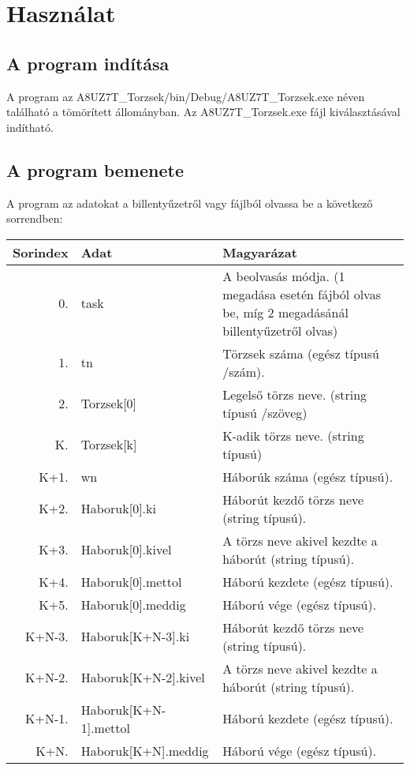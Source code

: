 \documentclass[12pt]{report}
\begin{document}
\section{Használat}
\subsection{A program indítása}
A program az A8UZ7T\_Torzsek/bin/Debug/A8UZ7T\_Torzsek.exe néven található a tömörített állományban. Az A8UZ7T\_Torzsek.exe fájl kiválasztásával indítható.\newline
\subsection{A program bemenete}
A program az adatokat a billentyűzetről vagy fájlból olvassa be a következő sorrendben:\newline
    \begin{tabular}{| r | l | p{10cm} |}
    \hline
    \textbf{Sorindex} & \textbf{Adat} & \textbf{Magyarázat} \\ \hline
    0. & task & A beolvasás módja. (1 megadása esetén fájból olvas be, míg 2 megadásánál billentyűzetről olvas) \\ \hline
1. & tn & Törzsek száma (egész típusú /szám). \\ \hline
2. & Torzsek[0] & Legelső törzs neve. (string típusú /szöveg)  \\ \hline
K. & Torzsek[k] & K-adik törzs neve. (string típusú)  \\ \hline
K+1. & wn & Háborúk száma (egész típusú).  \\ \hline
K+2. & Haboruk[0].ki & Háborút kezdő törzs neve (string típusú).  \\ \hline
K+3. & Haboruk[0].kivel & A törzs neve akivel kezdte a háborút (string típusú).  \\ \hline
K+4. & Haboruk[0].mettol & Háború kezdete (egész típusú).  \\ \hline
K+5. & Haboruk[0].meddig & Háború vége (egész típusú).  \\ \hline
K+N-3. & Haboruk[K+N-3].ki & Háborút kezdő törzs neve (string típusú).  \\ \hline
K+N-2. & Haboruk[K+N-2].kivel & A törzs neve akivel kezdte a háborút (string típusú).  \\ \hline
K+N-1. & Haboruk[K+N-1].mettol & Háború kezdete (egész típusú).  \\ \hline
K+N. & Haboruk[K+N].meddig & Háború vége (egész típusú).  \\ \hline
    \end{tabular}
\pagebreak
\end{document}
